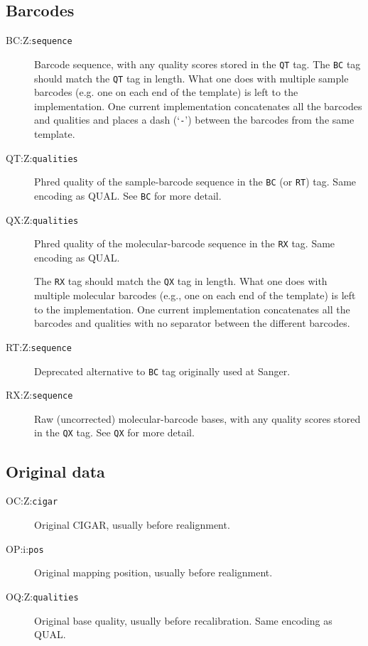\documentclass[10pt]{article}
\newcommand{\tagvalue}[1]{\tt #1}
\begin{document}
\subsection{Barcodes}

\begin{description}
\item[BC:Z:\tagvalue{sequence}]
Barcode sequence, with any quality scores stored in the {\tt QT} tag.
The {\tt BC} tag should match the {\tt QT} tag in length. 
What one does with multiple sample barcodes (e.g. one on each end of the template) is left to the implementation. 
One current implementation concatenates all the barcodes and qualities and places a dash (`{\tt -}') between the barcodes from the same template. 

\item[QT:Z:\tagvalue{qualities}] 
Phred quality of the sample-barcode sequence in the {\tt BC} (or {\tt RT}) tag. 
Same encoding as {\sf QUAL}. 
See {\tt BC} for more detail.

\item[QX:Z:\tagvalue{qualities}] 
Phred quality of the molecular-barcode sequence in the {\tt RX} tag. 
Same encoding as {\sf QUAL}. 

The {\tt RX} tag should match the {\tt QX} tag in length. 
What one does with multiple molecular barcodes (e.g., one on each end of the template) is left to the implementation. 
One current implementation concatenates all the barcodes and qualities with no separator between the different barcodes.

\item[RT:Z:\tagvalue{sequence}]
Deprecated alternative to {\tt BC} tag originally used at Sanger.

\item[RX:Z:\tagvalue{sequence}] 
Raw (uncorrected) molecular-barcode bases, with any quality scores stored in the {\tt QX} tag. 
See {\tt QX} for more detail.

\end{description}

\subsection{Original data}

\begin{description}
\item[OC:Z:\tagvalue{cigar}]
Original CIGAR, usually before realignment.

\item[OP:i:\tagvalue{pos}]
Original mapping position, usually before realignment.

\item[OQ:Z:\tagvalue{qualities}]
Original base quality, usually before recalibration.
Same encoding as {\sf QUAL}.
\end{description}
\end{document}
